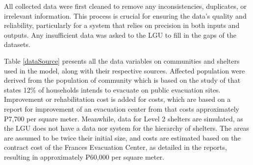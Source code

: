 	All collected data were first cleaned to remove any inconsistencies, duplicates, or irrelevant information. This process is crucial for ensuring the data’s quality and reliability, particularly for a system that relies on precision in both inputs and outputs. Any insufficient data was asked to the LGU to fill in the gaps of the datasets. 
	
	Table \ref{dataSource} presents all the data variables on communities and shelters used in the model, along with their respective sources. Affected population were derived from the population of community which is based on the study of \textcite{Opdyke2024} that states 12\% of households intends to evacuate on public evacuation sites. Improvement or rehabilitation cost is added for costs, which are based on a report for improvement of an evacuation center from \textcite{DilgL1area2022,DilgL1cost2022} that costs approximately ₱7,700 per square meter. Meanwhile, data for Level 2 shelters are simulated, as the LGU does not have a data nor system for the hierarchy of shelters. The areas are assumed to be twice their initial size, and costs are estimated based on the contract cost of the Frances Evacuation Center, as detailed in the \textcite{DilgL22022,Dpwh2022} reports, resulting in approximately ₱60,000 per square meter. 
	
